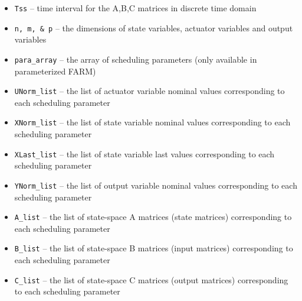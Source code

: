 \begin{itemize}
  \item \texttt{Tss} -- time interval for the A,B,C matrices in discrete time domain
  \item \texttt{n, m, \& p} -- the dimensions of state variables, actuator variables and output variables
  \item \texttt{para\_array} -- the array of scheduling parameters (only available in parameterized FARM)
  \item \texttt{UNorm\_list} -- the list of actuator variable nominal values corresponding to each scheduling parameter
  \item \texttt{XNorm\_list} -- the list of state variable nominal values corresponding to each scheduling parameter
  \item \texttt{XLast\_list} -- the list of state variable last values corresponding to each scheduling parameter
  \item \texttt{YNorm\_list} -- the list of output variable nominal values corresponding to each scheduling parameter
  \item \texttt{A\_list} -- the list of state-space A matrices (state matrices) corresponding to each scheduling parameter
  \item \texttt{B\_list} -- the list of state-space B matrices (input matrices) corresponding to each scheduling parameter
  \item \texttt{C\_list} -- the list of state-space C matrices (output matrices) corresponding to each scheduling parameter
\end{itemize}




